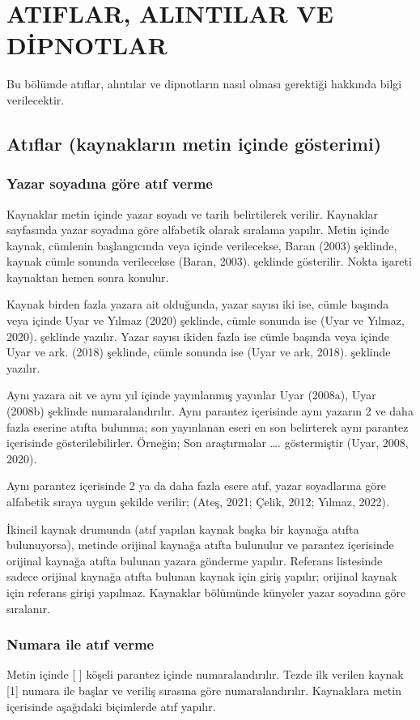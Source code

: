 \chapter{ATIFLAR, ALINTILAR VE DİPNOTLAR}
Bu bölümde atıflar, alıntılar ve dipnotların nasıl olması gerektiği hakkında bilgi verilecektir.

\section{Atıflar (kaynakların metin içinde gösterimi)}
\subsection{Yazar soyadına göre atıf verme}
Kaynaklar metin içinde yazar soyadı ve tarih belirtilerek verilir. Kaynaklar sayfasında yazar soyadına göre alfabetik olarak sıralama yapılır. Metin içinde kaynak, cümlenin başlangıcında veya içinde verilecekse, Baran (2003) şeklinde, kaynak cümle sonunda verilecekse (Baran, 2003). şeklinde gösterilir. Nokta işareti kaynaktan hemen sonra konulur.

Kaynak birden fazla yazara ait olduğunda, yazar sayısı iki ise, cümle başında veya içinde Uyar ve Yılmaz (2020) şeklinde, cümle sonunda ise (Uyar ve Yılmaz, 2020). şeklinde yazılır. Yazar sayısı ikiden fazla ise cümle başında veya içinde Uyar ve ark. (2018) şeklinde, cümle sonunda ise (Uyar ve ark, 2018). şeklinde yazılır.

Aynı yazara ait ve aynı yıl içinde yayınlanmış yayınlar Uyar (2008a), Uyar (2008b) şeklinde numaralandırılır. Aynı parantez içerisinde aynı yazarın 2 ve daha fazla eserine atıfta bulunma; son yayınlanan eseri en son belirterek aynı parantez içerisinde gösterilebilirler. Örneğin; Son araştırmalar \ldots{}. göstermiştir (Uyar, 2008, 2020).

Aynı parantez içerisinde 2 ya da daha fazla esere atıf, yazar soyadlarına göre alfabetik sıraya uygun şekilde verilir; (Ateş, 2021; Çelik, 2012; Yılmaz, 2022).

İkincil kaynak drumunda (atıf yapılan kaynak başka bir kaynağa atıfta bulunuyorsa), metinde orijinal kaynağa atıfta bulunulur ve parantez içerisinde orijinal kaynağa atıfta bulunan yazara gönderme yapılır. Referans listesinde sadece orijinal kaynağa atıfta bulunan kaynak için giriş yapılır; orijinal kaynak için referans girişi yapılmaz. Kaynaklar bölümünde künyeler yazar soyadına göre sıralanır.

\subsection{Numara ile atıf verme}
Metin içinde [ ] köşeli parantez içinde numaralandırılır. Tezde ilk verilen kaynak [1] numara ile başlar ve veriliş sırasına göre numaralandırılır. Kaynaklara metin içerisinde aşağıdaki biçimlerde atıf yapılır.

